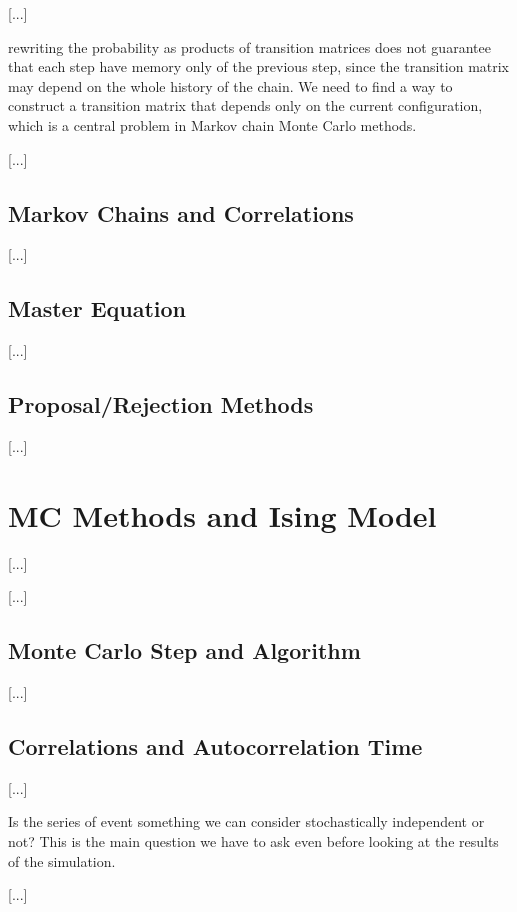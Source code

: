 [...]

rewriting the probability as products of transition matrices does not guarantee that each step have memory only of the previous step, since the transition matrix may depend on the whole history of the chain. We need to find a way to construct a transition matrix that depends only on the current configuration, which is a central problem in Markov chain Monte Carlo methods.

    [...]

\subsection{Markov Chains and Correlations}

[...]

\subsection{Master Equation}

[...]

\subsection{Proposal/Rejection Methods}

[...]



\section{MC Methods and Ising Model}

 [...]

 [...]

\subsection{Monte Carlo Step and Algorithm}

[...]

\subsection{Correlations and Autocorrelation Time}

[...]

Is the series of event something we can consider stochastically independent or not? This is the main question we have to ask even before looking at the results of the simulation.

    [...]

